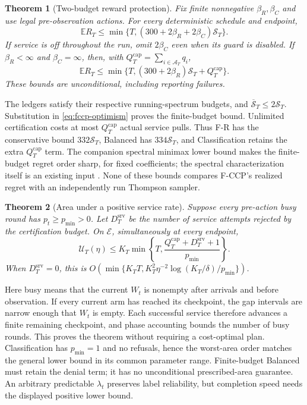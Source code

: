 \documentclass[11pt]{article}
\newtheorem{theorem}{Theorem}[section]
\theoremstyle{remark}
\newcommand{\E}{\mathbb E}
\begin{document}
\begin{theorem}[Two-budget reward protection]\label{thm:fccp-budget}
Fix finite nonnegative $\beta_R,\beta_C$ and use legal pre-observation
actions. For every deterministic schedule and endpoint,
\begin{equation}\label{eq:fccp-regret-finite}
 \E R_T\le\min\{T,(300+2\beta_R+2\beta_C)\mathcal S_T\}.
\end{equation}
If service is off throughout the run, omit $2\beta_C$ even when its guard is disabled.
If $\beta_R<\infty$ and $\beta_C=\infty$, then, with
$Q_T^{\mathrm{cap}}=\sum_{i\in\mathcal A_T}q_i$,
\begin{equation}\label{eq:fccp-regret-unlimited}
 \E R_T\le\min\{T,(300+2\beta_R)\mathcal S_T+Q_T^{\mathrm{cap}}\}.
\end{equation}
These bounds are unconditional, including reporting failures.
\end{theorem}
The ledgers satisfy their respective running-spectrum budgets, and
$\overline{\mathcal S}_T\le2\mathcal S_T$.
Substitution in \eqref{eq:fccp-optimism} proves the finite-budget bound.
Unlimited certification costs at most $Q_T^{\mathrm{cap}}$ actual
service pulls. Thus F-R has the conservative bound $332\mathcal S_T$,
Balanced has $334\mathcal S_T$, and Classification retains the extra
$Q_T^{\mathrm{cap}}$ term. The companion spectral minimax lower bound
makes the finite-budget regret order sharp, for fixed coefficients;
the spectral characterization itself is an existing input
\citep{temporalgeometry2026}. None of these bounds compares F-CCP's
realized regret with an independently run Thompson sampler.

\begin{theorem}[Area under a positive service rate]\label{thm:fccp-area}
Suppose every pre-action busy round has $p_t\ge p_{\min}>0$.
Let $D_T^{\mathrm{srv}}$ be the number of service attempts rejected by
the certification budget. On $\mathcal E$, simultaneously at every
endpoint,
\begin{equation}\label{eq:fccp-area}
 \mathcal U_T(\eta)\le K_T\min\left\{T,
                  \frac{Q_T^{\mathrm{cap}}+D_T^{\mathrm{srv}}+1}{p_{\min}}
                                      \right\}.
\end{equation}
When $D_T^{\mathrm{srv}}=0$, this is
$O(\min\{K_TT,K_T^2\eta^{-2}\log(K_T/\delta)/p_{\min}\})$.
\end{theorem}
Here busy means that the current $W_t$ is nonempty after arrivals and
before observation. If every current arm has reached its checkpoint,
the gap intervals are narrow enough that $W_t$ is empty. Each successful
service therefore advances a finite remaining checkpoint, and phase
accounting bounds the number of busy rounds. This proves the theorem
without requiring a cost-optimal plan. Classification has $p_{\min}=1$
and no refusals, hence the worst-area order matches the general lower
bound in its common parameter range. Finite-budget Balanced must retain
the denial term; it has no unconditional prescribed-area guarantee.
An arbitrary predictable $\lambda_t$ preserves label reliability, but
completion speed needs the displayed positive lower bound.
\end{document}
